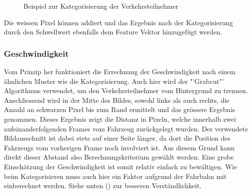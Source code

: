 {\begin{figure}[H]
  \centering
  \caption{Beispiel zur Kategorisierung der Verkehrsteilnehmer}
  \label{bCategorize}
\end{figure}

Die weissen Pixel können addiert und das Ergebnis nach der Kategorisierung durch den Schwellwert ebenfalls dem Feature Vektor hinzugefügt werden. \cite{GrabCut, CountNonZero}

\subsubsection{Geschwindigkeit}
Vom Prinzip her funktioniert die Errechnung der Geschwindigkeit nach einem ähnlichen Muster wie die Kategorisierung. Auch hier wird der "'Grabcut"' Algorithmus verwendet, um den Verkehrsteilnehmer vom Hintergrund zu trennen. Anschliessend wird in der Mitte des Bildes, sowohl links als auch rechts, die Anzahl an schwarzen Pixel bis zum Rand ermittelt und das grössere Ergebnis genommen. Dieses Ergebnis zeigt die Distanz in Pixeln, welche innerhalb zwei aufeinanderfolgenden Frames vom Fahrzeug zurückgelegt wurden. Der verwendete Bildausschnitt ist dabei stets auf einer Seite länger, da dort die Position des Fahrzeugs vom vorherigen Frame noch involviert ist. Aus diesem Grund kann direkt dieser Abstand also Berechnungskriterium gewählt werden. Eine grobe Einschätzung der Geschwindigkeit ist somit relativ einfach zu bewältigen. Wie beim Kategorisieren muss auch hier ein Faktor aufgrund der Fahrbahn mit einberechnet werden. Siehe unten () zur besseren Verständlichkeit.

}
